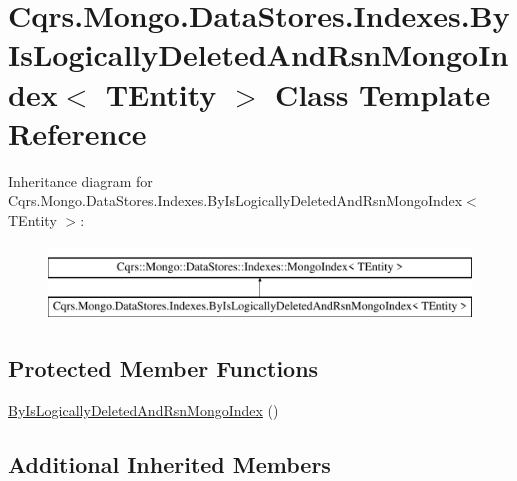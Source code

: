\hypertarget{classCqrs_1_1Mongo_1_1DataStores_1_1Indexes_1_1ByIsLogicallyDeletedAndRsnMongoIndex}{}\section{Cqrs.\+Mongo.\+Data\+Stores.\+Indexes.\+By\+Is\+Logically\+Deleted\+And\+Rsn\+Mongo\+Index$<$ T\+Entity $>$ Class Template Reference}
\label{classCqrs_1_1Mongo_1_1DataStores_1_1Indexes_1_1ByIsLogicallyDeletedAndRsnMongoIndex}
Inheritance diagram for Cqrs.\+Mongo.\+Data\+Stores.\+Indexes.\+By\+Is\+Logically\+Deleted\+And\+Rsn\+Mongo\+Index$<$ T\+Entity $>$\+:\begin{figure}[H]
\begin{center}
\leavevmode
\includegraphics[height=2.000000cm]{classCqrs_1_1Mongo_1_1DataStores_1_1Indexes_1_1ByIsLogicallyDeletedAndRsnMongoIndex}
\end{center}
\end{figure}
\subsection*{Protected Member Functions}
\begin{DoxyCompactItemize}
\item 
\hyperlink{classCqrs_1_1Mongo_1_1DataStores_1_1Indexes_1_1ByIsLogicallyDeletedAndRsnMongoIndex_a41c3a6c01a59bba485893fab8518df09_a41c3a6c01a59bba485893fab8518df09}{By\+Is\+Logically\+Deleted\+And\+Rsn\+Mongo\+Index} ()
\end{DoxyCompactItemize}
\subsection*{Additional Inherited Members}


